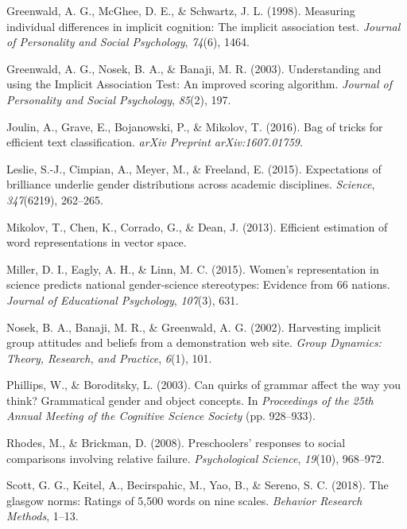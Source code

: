 \documentclass[man,floatsintext]{apa6}
\theoremstyle{definition}
\theoremstyle{definition}
\theoremstyle{definition}
\theoremstyle{remark}
\begin{document}
\hypertarget{ref-greenwald1998measuring}{}
Greenwald, A. G., McGhee, D. E., \& Schwartz, J. L. (1998). Measuring
individual differences in implicit cognition: The implicit association
test. \emph{Journal of Personality and Social Psychology}, \emph{74}(6),
1464.

\hypertarget{ref-greenwald2003understanding}{}
Greenwald, A. G., Nosek, B. A., \& Banaji, M. R. (2003). Understanding
and using the Implicit Association Test: An improved scoring algorithm.
\emph{Journal of Personality and Social Psychology}, \emph{85}(2), 197.

\hypertarget{ref-joulin2016bag}{}
Joulin, A., Grave, E., Bojanowski, P., \& Mikolov, T. (2016). Bag of
tricks for efficient text classification. \emph{arXiv Preprint
arXiv:1607.01759}.

\hypertarget{ref-leslie2015expectations}{}
Leslie, S.-J., Cimpian, A., Meyer, M., \& Freeland, E. (2015).
Expectations of brilliance underlie gender distributions across academic
disciplines. \emph{Science}, \emph{347}(6219), 262--265.

\hypertarget{ref-mikolov2013efficient}{}
Mikolov, T., Chen, K., Corrado, G., \& Dean, J. (2013). Efficient
estimation of word representations in vector space.

\hypertarget{ref-miller2015women}{}
Miller, D. I., Eagly, A. H., \& Linn, M. C. (2015). Women's
representation in science predicts national gender-science stereotypes:
Evidence from 66 nations. \emph{Journal of Educational Psychology},
\emph{107}(3), 631.

\hypertarget{ref-nosek2002harvesting}{}
Nosek, B. A., Banaji, M. R., \& Greenwald, A. G. (2002). Harvesting
implicit group attitudes and beliefs from a demonstration web site.
\emph{Group Dynamics: Theory, Research, and Practice}, \emph{6}(1), 101.

\hypertarget{ref-phillips2003can}{}
Phillips, W., \& Boroditsky, L. (2003). Can quirks of grammar affect the
way you think? Grammatical gender and object concepts. In
\emph{Proceedings of the 25th Annual Meeting of the Cognitive Science
Society} (pp. 928--933).

\hypertarget{ref-rhodes2008preschoolers}{}
Rhodes, M., \& Brickman, D. (2008). Preschoolers' responses to social
comparisons involving relative failure. \emph{Psychological Science},
\emph{19}(10), 968--972.

\hypertarget{ref-scott2018glasgow}{}
Scott, G. G., Keitel, A., Becirspahic, M., Yao, B., \& Sereno, S. C.
(2018). The glasgow norms: Ratings of 5,500 words on nine scales.
\emph{Behavior Research Methods}, 1--13.
\end{document}
